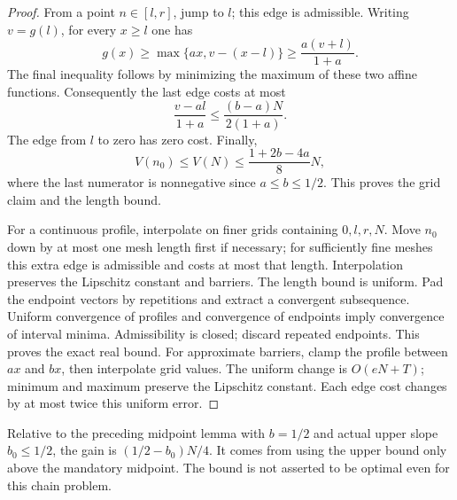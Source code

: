 \begin{proof}
From a point \(n\in[l,r]\), jump to \(l\); this edge is admissible.
Writing \(v=g(l)\), for every \(x\ge l\) one has
$$
 g(x)\ge\max\{ax,v-(x-l)\}\ge\frac{a(v+l)}{1+a}.
$$
The final inequality follows by minimizing the maximum of these two affine functions.
Consequently the last edge costs at most
$$
 \frac{v-al}{1+a}\le\frac{(b-a)N}{2(1+a)}.
$$
The edge from \(l\) to zero has zero cost. Finally,
$$
 V(n_0)\le V(N)\le\frac{1+2b-4a}{8}N,
$$
where the last numerator is nonnegative since \(a\le b\le1/2\).
This proves the grid claim and the length bound.

For a continuous profile, interpolate on finer grids containing \(0,l,r,N\).
Move \(n_0\) down by at most one mesh length first if necessary; for sufficiently
fine meshes this extra edge is admissible and costs at most that length.
Interpolation preserves the Lipschitz constant and barriers. The length bound is uniform.
Pad the endpoint vectors by repetitions and extract a convergent subsequence.
Uniform convergence of profiles and convergence of endpoints imply convergence of interval
minima. Admissibility is closed; discard repeated endpoints. This proves the exact real bound.
For approximate barriers, clamp the profile between \(ax\) and \(bx\), then interpolate
grid values. The uniform change is \(O(eN+T)\); minimum and maximum preserve the
Lipschitz constant. Each edge cost changes by at most twice this uniform error.
\end{proof}

Relative to the preceding midpoint lemma with \(b=1/2\) and actual upper slope
\(b_0\le1/2\), the gain is \((1/2-b_0)N/4\).
It comes from using the upper bound only above the mandatory midpoint.
The bound is not asserted to be optimal even for this chain problem.
